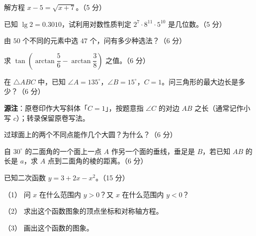 


\begin{question}
解方程 $x-5=\sqrt{x+7}$。（5 分）

\end{question}
\begin{question}
已知 $\lg 2=0.3010$，试利用对数性质判定 $2^{7}\cdot 8^{11}\cdot 5^{10}$ 是几位数。（5 分）

\end{question}
\begin{question}
由 $50$ 个不同的元素中选 $47$ 个，问有多少种选法？（6 分）

\end{question}
\begin{question}
求 $\tan\left(\arctan\dfrac{5}{6}-\arctan\dfrac{3}{8}\right)$ 之值。（6 分）

\end{question}
\begin{question}
在 $\triangle ABC$ 中，已知 $\angle A=135^\circ$，$\angle B=15^\circ$，$C=1$。问三角形的最大边长是多少？（6 分）

\begin{gktip}
\textbf{源注}：原卷印作大写斜体「$C=1$」，按题意指 $\angle C$ 的对边 $AB$ 之长（通常记作小写 $c$）；转录保留原卷写法。
\end{gktip}

\end{question}
\begin{question}
过球面上的两个不同点能作几个大圆？为什么？（6 分）

\end{question}
\begin{question}
自 $30^\circ$ 的二面角的一个面上一点 $A$ 作另一个面的垂线，垂足是 $B$，若已知 $AB$ 的长是 $a$，求 $A$ 点到二面角的棱的距离。（6 分）

\end{question}
\begin{question}
已知二次函数 $y=3+2x-x^{2}$。（15 分）

（1） 问 $x$ 在什么范围内 $y>0$？又 $x$ 在什么范围内 $y<0$？

（2） 求出这个函数图象的顶点坐标和对称轴方程。

（3） 画出这个函数的图象。

\end{question}

